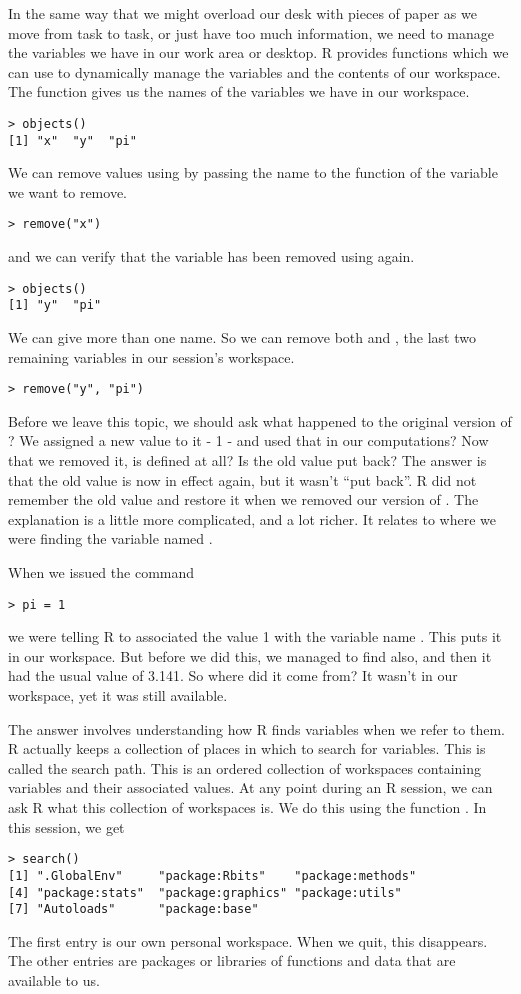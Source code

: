 In the same way that we might overload our desk with pieces of paper
as we move from task to task, or just have too much information, we
need to manage the variables we have in our work area or desktop. R
provides functions which we can use to dynamically manage the
variables and the contents of our workspace. The function
 gives us the names of the variables we have in our
workspace.
\begin{verbatim}
> objects()
[1] "x"  "y"  "pi"
\end{verbatim}
We can remove values using  by passing the name to
the function of the variable we want to remove.
\begin{verbatim}
> remove("x")  
\end{verbatim}
and we can verify that the variable has been removed using
 again.
\begin{verbatim}
> objects()
[1] "y"  "pi"
\end{verbatim}
We can give more than one name. So we can remove both 
and , the last two remaining variables in our
session's workspace.
\begin{verbatim}
> remove("y", "pi")
\end{verbatim}
Before we leave this topic, we should ask what happened to the
original version of ? We assigned a new value to it - 1
- and used that in our computations? Now that we removed it, is
 defined at all?  Is the old value put back? The answer
is that the old value is now in effect again, but it wasn't ``put
back''. R did not remember the old value and restore it when we removed
our version of . The explanation is a little more
complicated, and a lot richer. It relates to where we were finding the
variable named .

When we issued the command 
\begin{verbatim}
> pi = 1
\end{verbatim}
we were telling R to associated the value 1 with the variable name
. This puts it in our workspace. But before we did this,
we managed to find  also, and then it had the usual
value of 3.141. So where did it come from? It wasn't in our workspace,
yet it was still available.

The answer involves understanding how R finds variables when we refer
to them. R actually keeps a collection of places in which to search
for variables. This is called the search path. This is an ordered
collection of workspaces containing variables and their associated
values. At any point during an R session, we can ask R what this
collection of workspaces is. We do this using the function
. In this session, we get
\begin{verbatim}
> search()
[1] ".GlobalEnv"     "package:Rbits"    "package:methods" 
[4] "package:stats"  "package:graphics" "package:utils" 
[7] "Autoloads"      "package:base"    
\end{verbatim}
The first entry is our own personal workspace. When we quit, this
disappears. The other entries are packages or libraries of functions
and data that are available to us.

